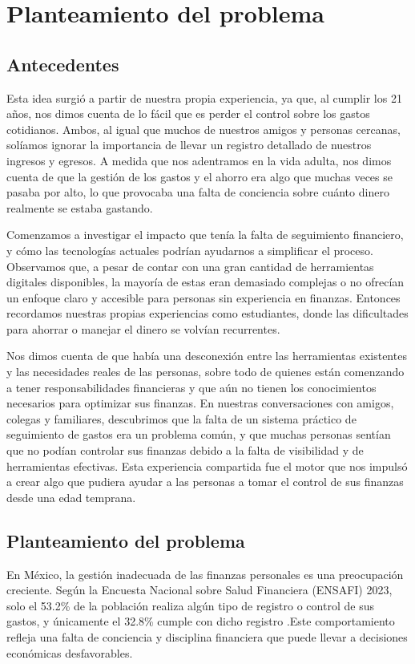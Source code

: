 \chapter{Planteamiento del problema}

\section{Antecedentes}
Esta idea surgió a partir de nuestra propia experiencia, ya que, al cumplir los 21 años, nos dimos cuenta de lo fácil que es perder el control sobre los gastos cotidianos. 
Ambos, al igual que muchos de nuestros amigos y personas cercanas, solíamos ignorar la importancia de llevar un registro detallado de nuestros ingresos y egresos. 
A medida que nos adentramos en la vida adulta, nos dimos cuenta de que la gestión de los gastos y el ahorro era algo que muchas veces se pasaba por alto, 
lo que provocaba una falta de conciencia sobre cuánto dinero realmente se estaba gastando. 

Comenzamos a investigar el impacto que tenía la falta de seguimiento financiero, y cómo las tecnologías actuales podrían ayudarnos a simplificar el proceso. 
Observamos que, a pesar de contar con una gran cantidad de herramientas digitales disponibles, la mayoría de estas eran demasiado complejas o no ofrecían un enfoque claro y 
accesible para personas sin experiencia en finanzas. Entonces recordamos nuestras propias experiencias como estudiantes, donde las dificultades para ahorrar o manejar el dinero 
se volvían recurrentes. 

Nos dimos cuenta de que había una desconexión entre las herramientas existentes y las necesidades reales de las personas, sobre todo de quienes están comenzando a tener 
responsabilidades financieras y que aún no tienen los conocimientos necesarios para optimizar sus finanzas. En nuestras conversaciones con amigos, colegas y familiares, 
descubrimos que la falta de un sistema práctico de seguimiento de gastos era un problema común, y que muchas personas sentían que no podían controlar sus finanzas debido a 
la falta de visibilidad y de herramientas efectivas. Esta experiencia compartida fue el motor que nos impulsó a crear algo que pudiera ayudar a las personas a tomar el control 
de sus finanzas desde una edad temprana. 

\section{Planteamiento del problema}
En México, la gestión inadecuada de las finanzas personales es una preocupación creciente. 
Según la Encuesta Nacional sobre Salud Financiera (ENSAFI) 2023, solo el 53.2\% de la población realiza algún tipo de registro o control de sus gastos, y únicamente el 32.8\% cumple con dicho registro \cite{inegi2024}.Este comportamiento refleja una falta de conciencia y disciplina financiera que puede llevar a 
decisiones económicas desfavorables. 

